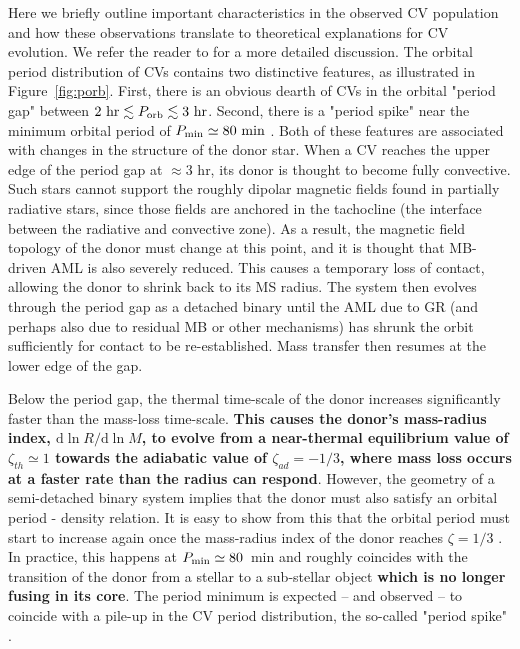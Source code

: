 \documentclass[fleqn,usenatbib]{mnras}
\begin{document}
Here we briefly outline important characteristics in the observed CV population and how these observations translate to theoretical explanations for CV evolution. We refer the reader to \citet{knigge11} for a more detailed discussion. The orbital period distribution of CVs contains two distinctive features, as illustrated in Figure~\ref{fig:porb}. First, there is an obvious dearth of CVs in the orbital "period gap" between $2~\mathrm{hr} \lesssim P_{\rm{orb}} \lesssim 3~\mathrm{hr}$. Second, there is a "period spike" near the minimum orbital period of $P_{\rm min} \simeq 80~\mathrm{min}$ \citep[e.g.][]{gansicke09}. Both of these features are associated with changes in the structure of the donor star. When a CV reaches the upper edge of the period gap at $\approx 3$ hr, its donor is thought to become fully convective. Such stars cannot support the roughly dipolar magnetic fields found in partially radiative stars, since those fields are anchored in the tachocline (the interface between the radiative and convective zone). As a result, the magnetic field topology of the donor must change at this point, and it is thought that MB-driven AML is also severely reduced. This causes a temporary loss of contact, allowing the donor to shrink back to its MS radius. The system then evolves through the period gap as a detached binary until the AML due to GR (and perhaps also due to residual MB or other mechanisms) has shrunk the orbit sufficiently for contact to be re-established. Mass transfer then resumes at the lower edge of the gap.

Below the period gap, the thermal time-scale of the donor increases significantly faster than the mass-loss time-scale. \textbf{This causes the donor's mass-radius index, $\mathrm{d}\ln R/\mathrm{d}\ln M$, to evolve from a near-thermal equilibrium value of $\zeta_{th} \simeq 1$ towards the adiabatic value of $\zeta_{ad} = -1/3$, where mass loss occurs at a faster rate than the radius can respond}. However, the geometry of a semi-detached binary system implies that the donor must also satisfy an orbital period - density relation. It is easy to show from this that the orbital period must start to increase again once the mass-radius index of the donor reaches $\zeta = 1/3$ \citep[see e.g.][]{knigge11}. In practice, this happens at $P_{\rm{min}} \simeq 80$~min and roughly coincides with the transition of the donor from a stellar to a sub-stellar object \textbf{which is no longer fusing in its core}. The period minimum is expected -- and observed -- to coincide with a pile-up in the CV period distribution, the so-called "period spike" \citep[][]{gansicke09}.
\end{document}
